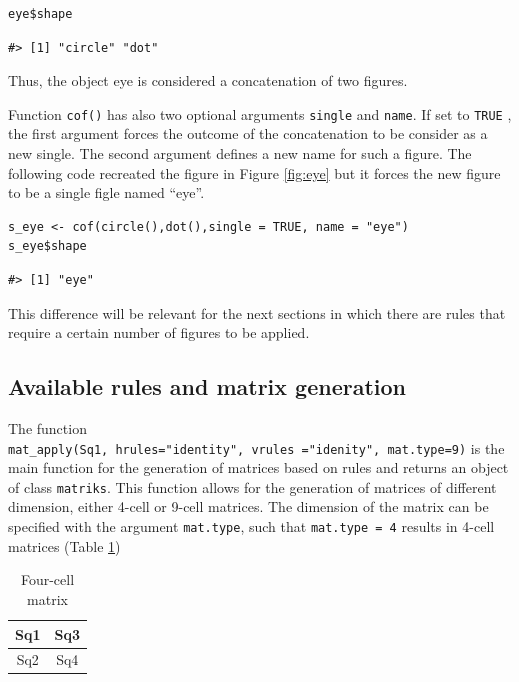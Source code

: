 \begin{verbatim}
eye$shape
\end{verbatim}

\begin{verbatim}
#> [1] "circle" "dot"
\end{verbatim}

Thus, the object eye is considered a concatenation of two figures.

Function \texttt{cof()} has also two optional arguments \texttt{single} and \texttt{name}. If set to \texttt{TRUE} ,
the first argument forces the outcome of the concatenation to be consider as a new single.
The second argument defines a new name for such a figure.
The following code recreated the figure in Figure \ref{fig:eye} but it forces the new figure to be a single figle named ``eye''.

\begin{verbatim}
s_eye <- cof(circle(),dot(),single = TRUE, name = "eye")
s_eye$shape
\end{verbatim}

\begin{verbatim}
#> [1] "eye"
\end{verbatim}

This difference will be relevant for the next sections in which there are rules that require a certain number of figures to be applied.

\subsection{Available rules and matrix generation}\label{available-rules-and-matrix-generation}

The function \texttt{mat\_apply(Sq1,\ hrules="identity",\ vrules\ ="idenity",\ mat.type=9)} is the main function for the generation of matrices based on rules and returns an object of class \texttt{matriks}.
This function allows for the generation of matrices of different dimension, either 4-cell or 9-cell matrices.
The dimension of the matrix can be specified with the argument \texttt{mat.type}, such that \texttt{mat.type\ =\ 4} results in 4-cell matrices (Table \ref{tab:fourCell-static})

\begin{table}

\caption{\label{tab:fourCell-static}Four-cell matrix}
\centering
\begin{tabular}[t]{c|c}
\hline
Sq1 & Sq3\\
\hline
Sq2 & Sq4\\
\hline
\end{tabular}
\end{table}


